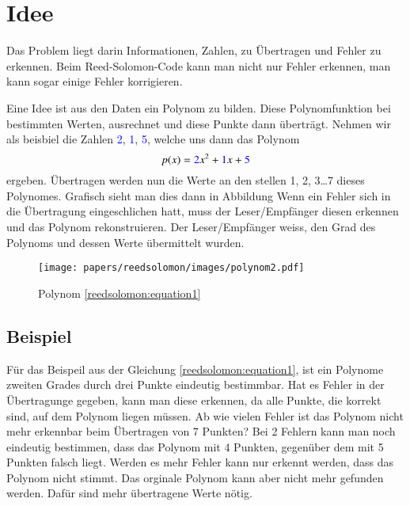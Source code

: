 %
%
%
\section{Idee
\label{reedsolomon:section:idee}}
Das Problem liegt darin Informationen, Zahlen, 
zu Übertragen und Fehler zu erkennen.
Beim Reed-Solomon-Code kann man nicht nur Fehler erkennen, 
man kann sogar einige Fehler korrigieren.

Eine Idee ist aus den Daten 
ein Polynom zu bilden.
Diese Polynomfunktion bei bestimmten Werten, ausrechnet und diese Punkte dann überträgt.
Nehmen wir als beisbiel die Zahlen \textcolor{blue}{2}, \textcolor{blue}{1}, \textcolor{blue}{5},
welche uns dann das Polynom 
\begin{equation}
p(x)
=
\textcolor{blue}{2}x^2 + \textcolor{blue}{1}x + \textcolor{blue}{5}
\label{reedsolomon:equation1}
\end{equation}
ergeben.
Übertragen werden nun die Werte an den stellen 1, 2, 3\dots 7 dieses Polynomes.
Grafisch sieht man dies dann in Abbildung 
Wenn ein Fehler sich in die Übertragung eingeschlichen hatt, muss der Leser/Empfänger diesen erkennen und das Polynom rekonstruieren.
Der Leser/Empfänger weiss, den Grad des Polynoms und dessen Werte übermittelt wurden. 

\begin{figure}
	\centering
	\texttt{[image: papers/reedsolomon/images/polynom2.pdf]}
	\caption{Polynom \eqref{reedsolomon:equation1}}
	\label{fig:polynom}
\end{figure}

\subsection{Beispiel}
Für das Beispeil aus der Gleichung \eqref{reedsolomon:equation1},
ist ein Polynome zweiten Grades durch drei Punkte eindeutig bestimmbar.
Hat es Fehler in der Übertragunge gegeben, kann man diese erkennen,
da alle Punkte, die korrekt sind, auf dem Polynom liegen müssen.
Ab wie vielen Fehler ist das Polynom nicht mehr erkennbar beim Übertragen von 7 Punkten?
Bei 2 Fehlern kann man noch eindeutig bestimmen, dass das Polynom mit 4 Punkten,
gegenüber dem mit 5 Punkten falsch liegt.
Werden es mehr Fehler kann nur erkennt werden, dass das Polynom nicht stimmt.
Das orginale Polynom kann aber nicht mehr gefunden werden.
Dafür sind mehr übertragene Werte nötig.

